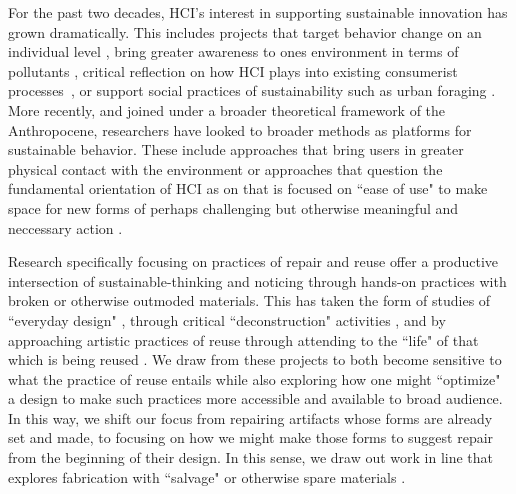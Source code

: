 For the past two decades, HCI's interest in supporting sustainable innovation has grown dramatically. This includes projects that target behavior change on an individual level \cite{disalvo_mapping_2010, dourish_hci_2010}, bring greater awareness to ones environment in terms of pollutants \cite{kim_wearair:_2010, da_costa_interspecies_nodate, aoki_vehicle_2009}, critical reflection on how HCI plays into existing consumerist processes~\cite{blevis_sustainable_2007, pan_fashion_2014,raghavan_means_2017}, or support social practices of sustainability such as urban foraging \cite{disalvo_fruit_2017}. More recently, and joined under a broader theoretical framework of the Anthropocene, researchers have looked to broader methods as platforms for sustainable behavior. These include approaches that bring users in greater physical contact with the environment \cite{liu_design_2018, kuznetsov_nurturing_2011, light_design_2017} or approaches that question the fundamental orientation of HCI as on that is focused on ``ease of use" \cite{light_design_2017} to make space for new forms of perhaps challenging but otherwise meaningful and neccessary action \cite{devendorf_hci-amusement_2019, Dew:2018:MWL:3232617.3232626, Dew:2019:DWS:3322276.3322320}.

Research specifically focusing on practices of repair and reuse \cite{jackson_repair_2012, Dew:2019:DWS:3322276.3322320, Dew:2018:LWC:3173574.3174159, Wyche_postcolonialphone, Wakkary_greendesignfiction, Tsaknaki_thingsfallapart} offer a productive intersection of sustainable-thinking and noticing through hands-on practices with broken or otherwise outmoded materials. This has taken the form of studies of ``everyday design" \cite{Wakkary:2009:SIC:1518701.1518761, Maestri:2011:URC:2069618.2069633}, through critical ``deconstruction" activities \cite{Murer:2018:MTA:3196709.3196806, Murer:2015:DID:2882850.2882860, Murer:2017:UDE:3024969.3024993}
, and by approaching artistic practices of reuse through attending to the ``life" of that which is being reused \cite{jackson_breakdown_2014}. We draw from these projects to both become sensitive to what the practice of reuse entails while also exploring how one might ``optimize" a design to make such practices more accessible and available to broad audience. In this way, we shift our focus from repairing artifacts whose forms are already set and made, to focusing on how we might make those forms to suggest repair from the beginning of their design. In this sense, we draw out work in line that explores fabrication with ``salvage" \cite{Dew:2019:DWS:3322276.3322320} or otherwise spare materials \cite{devendorf_being_2015,KovacsTrussFormer}. 


